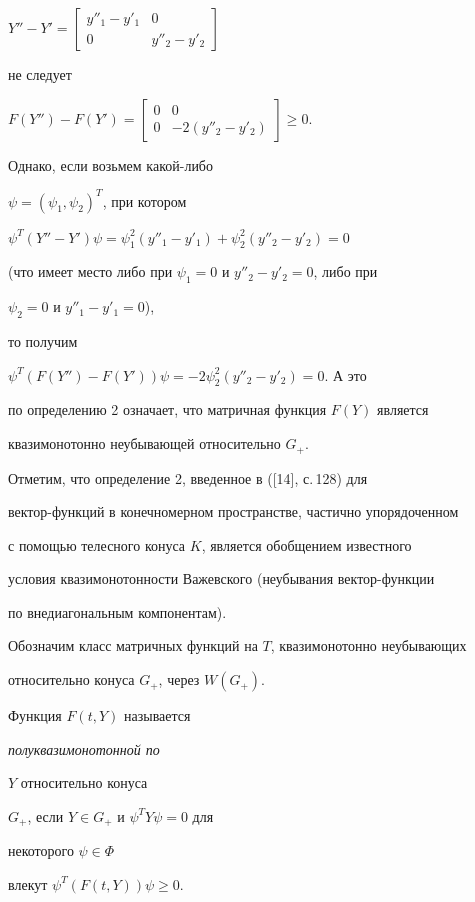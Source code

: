 $Y''-Y'= 


\begin{bmatrix} 


y''_1-y'_1 & 0 \\ 0 & y''_2-y'_2 


\end{bmatrix}$ 


не следует 


$F(Y'')-F(Y')= 


\begin{bmatrix} 


0 & 0 \\ 0 & -2(y''_2-y'_2) 


\end{bmatrix}\ge0$. 


Однако, если возьмем какой-либо 


$\psi=(\psi_1,\psi_2)^T$, при котором 


$\psi^T(Y''-Y')\psi=\psi^2_1(y''_1-y'_1)+ 


\psi^2_2(y''_2-y'_2)=0$ 


(что имеет место либо при $\psi_1=0$ и $y''_2-y'_2=0$, либо при 


$\psi_2=0$ и $y''_1-y'_1=0$), 


то получим 


$\psi^T(F(Y'')-F(Y'))\psi=-2\psi^2_2(y''_2-y'_2)=0$. А это 


по определению 2 означает, что матричная функция $F(Y)$ является 


квазимонотонно неубывающей относительно $G_+$. 


 


Отметим, что определение 2, введенное в ([14], с.\,128) для 


вектор-функций в конечномерном пространстве, частично упорядоченном 


с помощью телесного конуса $K$, является обобщением известного 


условия квазимонотонности Важевского (неубывания вектор-функции 


по внедиагональным компонентам). 


 


Обозначим класс матричных функций на $T$, квазимонотонно неубывающих 


относительно конуса $G_+$, через $W(G_+)$. 


 


\begin{defn} 


Функция $F(t,Y)$ называется {\it полуквазимонотонной по 


$Y$ относительно конуса} $G_+$, если $Y\in G_+$ и $\psi^T Y\psi=0$ для 


некоторого $\psi\in\Phi$ 


влекут $\psi^T(F(t,Y))\psi\ge0$. 


\end{defn} 


